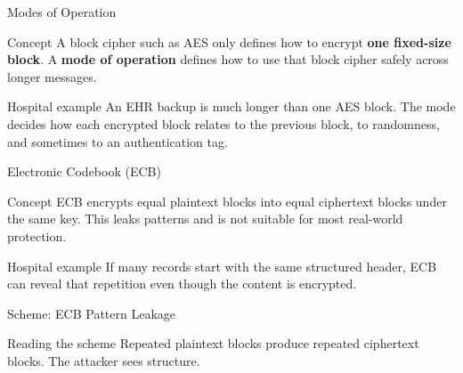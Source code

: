 \documentclass[presentation]{beamer}
\begin{document}
\begin{frame}[c]{Modes of Operation}
\begin{block}{Concept}
A block cipher such as AES only defines how to encrypt \textbf{one fixed-size block}. A
\textbf{mode of operation} defines how to use that block cipher safely across longer messages.
\end{block}

\begin{exampleblock}{Hospital example}
An EHR backup is much longer than one AES block. The mode decides how each encrypted block relates
to the previous block, to randomness, and sometimes to an authentication tag.
\end{exampleblock}
\end{frame}

\begin{frame}[c]{Electronic Codebook (ECB)}
\begin{block}{Concept}
ECB encrypts equal plaintext blocks into equal ciphertext blocks under the same key. This leaks
patterns and is not suitable for most real-world protection.
\end{block}

\begin{exampleblock}{Hospital example}
If many records start with the same structured header, ECB can reveal that repetition even though
the content is encrypted.
\end{exampleblock}
\end{frame}

\begin{frame}[c]{Scheme: ECB Pattern Leakage}
\begin{center}
\end{center}

\begin{block}{Reading the scheme}
Repeated plaintext blocks produce repeated ciphertext blocks. The attacker sees structure.
\end{block}
\end{frame}
\end{document}
